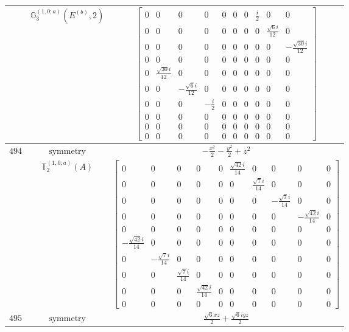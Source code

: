 \documentclass[fleqn,8pt,landscape]{jsarticle}
\begin{document}
\begin{longtable}{ccc}
$  $ & $ \mathbb{G}_{3}^{(1,0;a)}(E^{(b)},2) $ & $ \begin{bmatrix} 0 & 0 & 0 & 0 & 0 & 0 & 0 & \frac{i}{2} & 0 & 0 \\ 0 & 0 & 0 & 0 & 0 & 0 & 0 & 0 & \frac{\sqrt{6} i}{12} & 0 \\ 0 & 0 & 0 & 0 & 0 & 0 & 0 & 0 & 0 & - \frac{\sqrt{30} i}{12} \\ 0 & 0 & 0 & 0 & 0 & 0 & 0 & 0 & 0 & 0 \\ 0 & \frac{\sqrt{30} i}{12} & 0 & 0 & 0 & 0 & 0 & 0 & 0 & 0 \\ 0 & 0 & - \frac{\sqrt{6} i}{12} & 0 & 0 & 0 & 0 & 0 & 0 & 0 \\ 0 & 0 & 0 & - \frac{i}{2} & 0 & 0 & 0 & 0 & 0 & 0 \\ 0 & 0 & 0 & 0 & 0 & 0 & 0 & 0 & 0 & 0 \\ 0 & 0 & 0 & 0 & 0 & 0 & 0 & 0 & 0 & 0 \\ 0 & 0 & 0 & 0 & 0 & 0 & 0 & 0 & 0 & 0 \end{bmatrix} $ \\ \hline
$ 494 $ & $ \text{symmetry} $ & $ - \frac{x^{2}}{2} - \frac{y^{2}}{2} + z^{2} $ \\
$  $ & $ \mathbb{T}_{2}^{(1,0;a)}(A) $ & $ \begin{bmatrix} 0 & 0 & 0 & 0 & 0 & \frac{\sqrt{42} i}{14} & 0 & 0 & 0 & 0 \\ 0 & 0 & 0 & 0 & 0 & 0 & \frac{\sqrt{7} i}{14} & 0 & 0 & 0 \\ 0 & 0 & 0 & 0 & 0 & 0 & 0 & - \frac{\sqrt{7} i}{14} & 0 & 0 \\ 0 & 0 & 0 & 0 & 0 & 0 & 0 & 0 & - \frac{\sqrt{42} i}{14} & 0 \\ 0 & 0 & 0 & 0 & 0 & 0 & 0 & 0 & 0 & 0 \\ - \frac{\sqrt{42} i}{14} & 0 & 0 & 0 & 0 & 0 & 0 & 0 & 0 & 0 \\ 0 & - \frac{\sqrt{7} i}{14} & 0 & 0 & 0 & 0 & 0 & 0 & 0 & 0 \\ 0 & 0 & \frac{\sqrt{7} i}{14} & 0 & 0 & 0 & 0 & 0 & 0 & 0 \\ 0 & 0 & 0 & \frac{\sqrt{42} i}{14} & 0 & 0 & 0 & 0 & 0 & 0 \\ 0 & 0 & 0 & 0 & 0 & 0 & 0 & 0 & 0 & 0 \end{bmatrix} $ \\ \hline
$ 495 $ & $ \text{symmetry} $ & $ \frac{\sqrt{6} x z}{2} + \frac{\sqrt{6} i y z}{2} $ \\

\end{longtable}
\end{document}

